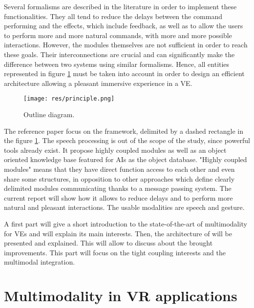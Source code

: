 \documentclass[a4paper]{article}
\begin{document}
Several formalisms are described in the literature in order to implement these functionalities. They all tend to reduce the delays between the command performing and the effects, which include feedback, as well as to allow the users to perform more and more natural commands, with more and more possible interactions. However, the modules themselves are not sufficient in order to reach these goals. Their interconnections are crucial and can significantly make the difference between two systems using similar formalisms. Hence, all entities represented in figure \ref{fig:principle} must be taken into account in order to design an efficient architecture allowing a pleasant immersive experience in a VE.

\begin{figure}[!h]
\centering
\texttt{[image: res/principle.png]}
\caption{\label{fig:principle}Outline diagram.}
\end{figure}

The reference paper \cite{latoschik} focus on the framework, delimited by a dashed rectangle in the figure \ref{fig:principle}. The speech processing is out of the scope of the study, since powerful tools already exist. It propose highly coupled modules as well as an object oriented knowledge base featured for AIs as the object database. "Highly coupled modules" means that they have direct function access to each other and even share some structures, in opposition to other approaches which define clearly delimited modules communicating thanks to a message passing system. The current report will show how it allows to reduce delays and to perform more natural and pleasant interactions. The usable modalities are speech and gesture.

A first part will give a short introduction to the state-of-the-art of multimodality for VEs and will explain its main interests. Then, the architecture of \cite{latoschik} will be presented and explained. This will allow to discuss about the brought improvements. This part will focus on the tight coupling interests and the multimodal integration.

\section{Multimodality in VR applications}
\end{document}
